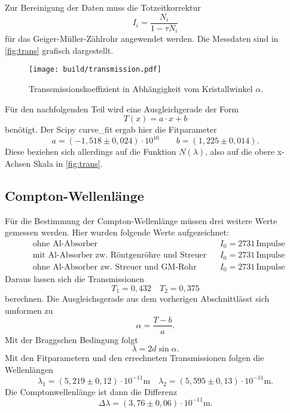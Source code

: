 Zur Bereinigung der Daten muss die Totzeitkorrektur 
\[
	I_i = \frac{N_i}{1 - \tau N_i}
\]
für das Geiger-Müller-Zählrohr angewendet werden.
Die Messdaten sind in \autoref{fig:trans} grafisch dargestellt.
\begin{figure}
	\centering
	\texttt{[image: build/transmission.pdf]}
	\caption{Transsmissionskoeffizient in Abhängigkeit vom Kristallwinkel $\alpha$.}
	\label{fig:trans}
\end{figure}
Für den nachfolgenden Teil wird eine Ausgleichgerade der Form 
\[
	T(x) = a\cdot x + b
\]
benötigt. Der Scipy curve\_fit ergab hier die Fitparameter
\begin{equation}
	a = (-1,518 \pm 0,024) \cdot 10^{10}
	\qquad
	b = (1,225 \pm 0,014).
\end{equation}
Diese beziehen sich allerdings auf die Funktion $N(\lambda)$, also auf die obere x-Achsen
Skala in \autoref{fig:trans}.

\newpage
\subsection{Compton-Wellenlänge}
\label{sec:Compton-Wellenlänge}
Für die Bestimmung der Compton-Wellenlänge müssen drei weitere Werte gemessen werden. Hier
wurden folgende Werte aufgezeichnet:
\begin{align*}
	&\text{ohne Al-Absorber} & & I_0 = 2731 \, \text{Impulse} \\
	&\text{mit Al-Absorber zw. Röntgenröhre und Streuer} & & I_0 = 2731 \, \text{Impulse} \\
	&\text{ohne Al-Absorber zw. Streuer und GM-Rohr} & & I_0 = 2731 \, \text{Impulse}
\end{align*}
Daraus lassen sich die Transmissionen
\begin{equation}
	T_1 = 0,432 \quad
	T_2 = 0,375
\end{equation}
berechnen. Die Ausgleichsgerade aus dem vorherigen Abschnittlässt sich umformen zu
\[ \alpha = \frac{T - b}{a}. \]
Mit der Braggschen Bedingung folgt 
\[
	\lambda = 2d \sin\alpha.
\]
Mit den Fitparametern und den errechneten Transmissionen folgen die Wellenlängen
\begin{equation}
	\lambda_1 = (5,219 \pm 0,12) \cdot 10^{-11} \si{\meter}
	\quad
	\lambda_2 = (5,595 \pm 0,13) \cdot 10^{-11} \si{\meter}.
\end{equation}
Die Comptonwellenlänge ist dann die Differenz
\[
	\Delta \lambda = (3,76 \pm 0,06) \cdot 10^{-11} \si{\meter}.
\]
	
